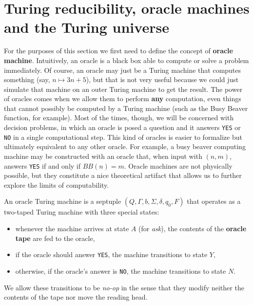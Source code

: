 \documentclass[../main.tex]{memoir}
\begin{document}
\section{Turing reducibility, oracle machines and the Turing universe}

For the purposes of this section we first need to define the concept of \textbf{oracle machine}. Intuitively, an oracle is a black box able to compute or solve a problem immediately. Of course, an oracle may just be a Turing machine that computes something (say, $n \mapsto 3n + 5$), but that is not very useful because we could just simulate that machine on an outer Turing machine to get the result. The power of oracles comes when we allow them to perform \textbf{any} computation, even things that cannot possibly be computed by a Turing machine (such as the Busy Beaver function, for example). Most of the times, though, we will be concerned with decision problems, in which an oracle is posed a question and it answers \texttt{YES} or \texttt{NO} in a single computational step. This kind of oracles is easier to formalize but ultimately equivalent to any other oracle. For example, a busy beaver computing machine may be constructed with an oracle that, when input with $(n, m)$, answers \texttt{YES} if and only if $BB(n) = m$. Oracle machines are not physically possible, but they constitute a nice theoretical artifact that allows us to further explore the limits of computability.

\begin{definition}
  \label{def:oracle-turing-machine}
  An oracle Turing machine is a septuple $(Q, \Gamma, b, \Sigma, \delta, q_0, F)$ that operates as a two-taped Turing machine with three special states:

  \begin{itemize}
  \item whenever the machine arrives at state $A$ (for \textit{ask}), the contents of the \textbf{oracle tape} are fed to the oracle,
  \item if the oracle should answer \texttt{YES}, the machine transitions to state $Y$,
  \item otherwise, if the oracle's answer is \texttt{NO}, the machine transitions to state $N$.
  \end{itemize}

  We allow these transitions to be \textit{no-op} in the sense that they modify neither the contents of the tape nor move the reading head.
\end{definition}
\end{document}
